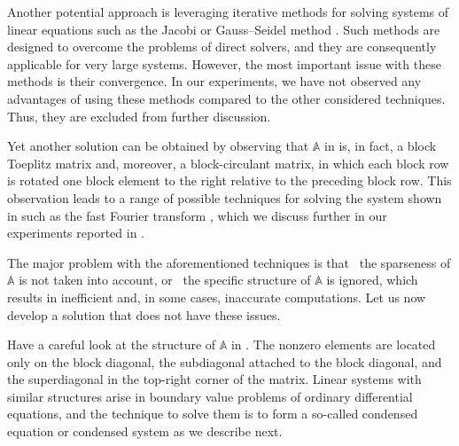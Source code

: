 Another potential approach is leveraging iterative methods for solving systems
of linear equations such as the Jacobi or Gauss--Seidel method \cite{press2007}.
Such methods are designed to overcome the problems of direct solvers, and they
are consequently applicable for very large systems. However, the most important
issue with these methods is their convergence. In our experiments, we have not
observed any advantages of using these methods compared to the other considered
techniques. Thus, they are excluded from further discussion.

Yet another solution can be obtained by observing that $\mathbb{A}$ in
 is, in fact, a block Toeplitz matrix and,
moreover, a block-circulant matrix, in which each block row is rotated one block
element to the right relative to the preceding block row. This observation leads
to a range of possible techniques for solving the system shown in
 such as the fast Fourier transform
\cite{mazancourt1983}, which we discuss further in our experiments reported in
.

The major problem with the aforementioned techniques is that \one~the sparseness
of $\mathbb{A}$ is not taken into account, or \two~the specific structure of
$\mathbb{A}$ is ignored, which results in inefficient and, in some cases,
inaccurate computations. Let us now develop a solution that does not have these
issues.

Have a careful look at the structure of $\mathbb{A}$ in
. The nonzero elements are located only on the
block diagonal, the subdiagonal attached to the block diagonal, and the
superdiagonal in the top-right corner of the matrix. Linear systems with similar
structures arise in boundary value problems of ordinary differential equations,
and the technique to solve them is to form a so-called condensed equation or
condensed system \cite{stoer2002} as we describe next.

